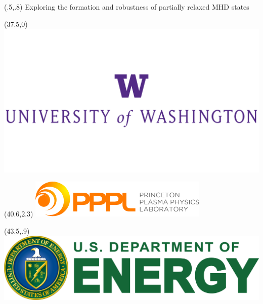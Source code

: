 \documentclass{beamer}
\begin{document}
\begin{frame}[t]
\begin{textblock}{30}(.5,.8)
\fontsize{72}{60}\selectfont Exploring the formation and robustness of partially relaxed MHD states
\end{textblock}
\begin{textblock}{24}(37.5,0)
\includegraphics[scale=.1]{uofwa.png}
\end{textblock}
\begin{textblock}{24}(40.6,2.3)
\includegraphics[scale=1]{pppl.png}
\end{textblock}
\begin{textblock}{24}(43.5,.9)
\includegraphics[scale=.1]{doe_logo.png}\break
\end{textblock}

\newcommand{\lr}[1]{\left(#1\right)}
\newcommand{\lrsq}[1]{\left[ #1 \right]}
\newcommand{\lra}[1]{\left\langle #1 \right\rangle}
\newcommand{\lrfrac}[2]{\left(\frac{#1}{#2}\right)}
\newcommand{\lrsqfrac}[2]{\left[\frac{#1}{#2}\right]}
\newcommand{\needref}{\textcolor{red}{[REF]}~}


\end{frame}
\end{document}
